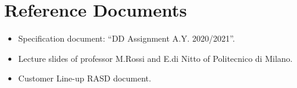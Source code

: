 \section{Reference Documents}

\begin{itemize}
	\item Specification document: “DD Assignment A.Y. 2020/2021”.
	\item Lecture slides of professor M.Rossi and E.di Nitto of Politecnico di Milano.
	\item Customer Line-up RASD document.
\end{itemize}